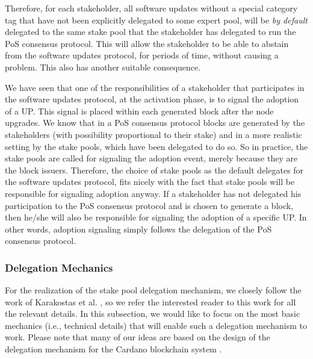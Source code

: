 Therefore, for each stakeholder, all software updates without a special category tag that have not been explicitly delegated to some expert pool, will be \emph{by default} delegated to the same stake pool that the stakeholder has delegated to run the  PoS consensus protocol. This will allow the stakeholder to be able to abstain from the software updates protocol, for periods of time, without causing a problem. This also has another suitable consequence.

We have seen that one of the responsibilities of a stakeholder that participates in the software updates protocol, at the activation phase, is to signal the adoption of a UP. This signal is placed within each generated block after the node upgrades. We know that in a PoS consensus protocol blocks are generated by the stakeholders (with possibility proportional to their stake) and in a more realistic setting by the stake pools, which have been delegated to do so. So in practice, the stake pools are called for signaling the adoption event, merely because they are the block issuers. Therefore, the choice of stake pools as the default delegates for the software updates protocol, fits nicely with the fact that stake pools will be responsible for signaling adoption anyway. If a stakeholder has not delegated his participation to the PoS consensus protocol and is chosen to generate a block, then he/she will also be responsible for signaling the adoption of a specific UP. In other words, adoption signaling simply follows the delegation of the PoS consensus protocol.

\subsubsection{Delegation Mechanics}
For the realization of the stake pool delegation mechanism, we closely follow the work of Karakostas et al. \cite{stakepools}, so we refer the interested reader to this work for all the relevant details. In this subsection, we would like to focus
on the most basic mechanics (i.e., technical details) that will enable such a delegation mechanism to work. Please note that many of our ideas are based on the design of the delegation mechanism for the Cardano blockchain system \cite{deldesign}.

